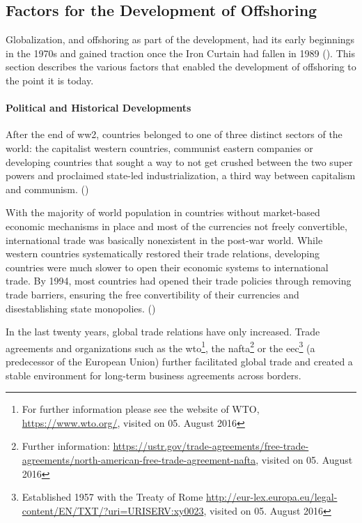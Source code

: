\subsection{Factors for the Development of Offshoring}

Globalization, and offshoring as part of the development, had its early beginnings in the 1970s and gained traction once the Iron Curtain had fallen in 1989 (\cite[p. 1]{Sachs.1995}). This section describes the various factors that enabled the development of offshoring to the point it is today.

\paragraph{Political and Historical Developments}
After the end of \gls{ww2}, countries belonged to one of three distinct sectors of the world: the capitalist western countries, communist eastern companies or developing countries that sought a way to not get crushed between the two super powers and proclaimed state-led industrialization, a third way between capitalism and communism. (\cite[pp. 12f]{Sachs.1995})

With the majority of world population in countries without market-based economic mechanisms in place and most of the currencies not freely convertible, international trade was basically nonexistent in the post-war world. While western countries systematically restored their trade relations, developing countries were much slower to open their economic systems to international trade. By 1994, most countries had opened their trade policies through removing trade barriers, ensuring the free convertibility of their currencies and disestablishing state monopolies. (\cite[pp. 12-25]{Sachs.1995})

In the last twenty years, global trade relations have only increased. Trade agreements and organizations such as the \gls{wto}\footnote{For further information please see the website of WTO, \url{https://www.wto.org/}, visited on 05. \nolinebreak August 2016}, the \gls{nafta}\footnote{Further information: \url{https://ustr.gov/trade-agreements/free-trade-agreements/north-american-free-trade-agreement-nafta}, visited on 05. August 2016} or  the \gls{eec}\footnote{Established 1957 with the Treaty of Rome \url{http://eur-lex.europa.eu/legal-content/EN/TXT/?uri=URISERV:xy0023}, visited on 05. August 2016} (a predecessor of the European Union) further facilitated global trade and created a stable environment for long-term business agreements across borders. 

